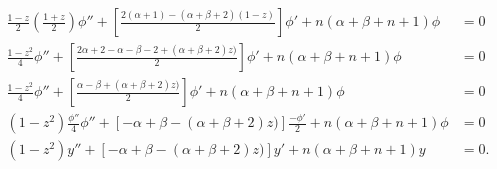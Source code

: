 \documentclass[a4paper,10pt, leqno, answers]{exam}  %
\begin{document}
\begin{questions}
\begin{solution}
\begin{align*}
            \frac{1 - z}{2} \left( \frac{1 + z}{2} \right) \phi'' + \left[ \frac{2(\alpha + 1) - (\alpha + \beta + 2) (1 - z)}{2} \right] \phi' + n (\alpha + \beta + n + 1) \phi &= 0 \\
            \frac{1 - z^2}{4} \phi'' + \left[ \frac{2\alpha + 2 - \alpha - \beta - 2 + (\alpha + \beta + 2)z)}{2} \right] \phi' + n (\alpha + \beta + n + 1) \phi &= 0 \\
            \frac{1 - z^2}{4} \phi'' + \left[ \frac{\alpha - \beta + (\alpha + \beta + 2)z)}{2} \right] \phi' + n (\alpha + \beta + n + 1) \phi &= 0 \\
            (1 - z^2) \frac{\phi''}{4} \phi'' + \left[ - \alpha + \beta - (\alpha + \beta + 2)z)\right] \frac{-\phi'}{2} + n (\alpha + \beta + n + 1) \phi &= 0 \\
            (1 - z^2) y'' + \left[ - \alpha + \beta - (\alpha + \beta + 2)z)\right] y' + n (\alpha + \beta + n + 1) y &= 0.
        \end{align*}
    \end{solution}


\end{questions}
\end{document}
